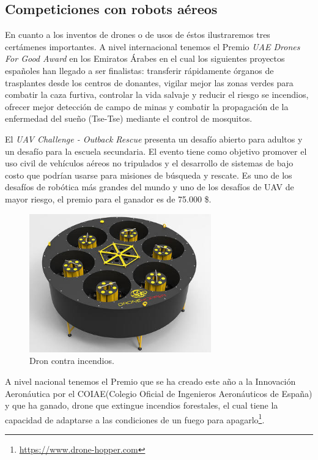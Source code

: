 \subsection{Competiciones con robots aéreos}
\hspace{1cm} En cuanto a los inventos de drones o de usos de éstos ilustraremos tres certámenes importantes. A nivel internacional tenemos el Premio \textit{UAE Drones For Good Award} en los Emiratos Árabes en el cual los siguientes proyectos españoles han llegado a ser finalistas: transferir rápidamente órganos de trasplantes desde los centros de donantes, vigilar mejor las zonas verdes para combatir la caza furtiva, controlar la vida salvaje y reducir el riesgo se incendios, ofrecer mejor detección de campo de minas y combatir la propagación de la enfermedad del sueño (Tse-Tse) mediante el control de mosquitos.

\hspace{1cm} El \textit{UAV Challenge - Outback Rescue} presenta un desafío abierto para adultos y un desafío para la escuela secundaria. El evento tiene como objetivo promover el uso civil de vehículos aéreos no tripulados y el desarrollo de sistemas de bajo costo que podrían usarse para misiones de búsqueda y rescate. Es uno de los desafíos de robótica más grandes del mundo y uno de los desafíos de UAV de mayor riesgo, el premio para el ganador es de 75.000 \$.

\begin{figure}[H]
	\begin{center}
		\includegraphics[width=0.7\textwidth]{imag/IMG7.jpeg}
				\caption{Dron contra incendios.} 
	\label{fig:Dron Hopper.}	
	\end{center}
\end{figure}

\hspace{1cm} A nivel nacional tenemos el Premio que se ha creado este año a la Innovación Aeronáutica por el COIAE(Colegio Oficial de Ingenieros Aeronáuticos de España) y que ha ganado, drone que extingue incendios forestales, el cual tiene la capacidad de adaptarse a las condiciones de un fuego para apagarlo\footnote{\url{https://www.drone-hopper.com}}.


